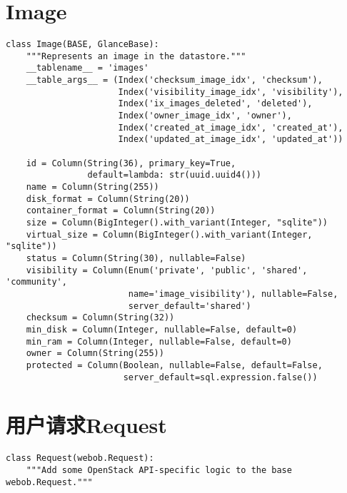 \documentclass[a4paper,left=1.5cm,right=1.5cm,11pt]{article}
\begin{document}
\section{Image}
    \begin{lstlisting}
class Image(BASE, GlanceBase):
    """Represents an image in the datastore."""
    __tablename__ = 'images'
    __table_args__ = (Index('checksum_image_idx', 'checksum'),
                      Index('visibility_image_idx', 'visibility'),
                      Index('ix_images_deleted', 'deleted'),
                      Index('owner_image_idx', 'owner'),
                      Index('created_at_image_idx', 'created_at'),
                      Index('updated_at_image_idx', 'updated_at'))

    id = Column(String(36), primary_key=True,
                default=lambda: str(uuid.uuid4()))
    name = Column(String(255))
    disk_format = Column(String(20))
    container_format = Column(String(20))
    size = Column(BigInteger().with_variant(Integer, "sqlite"))
    virtual_size = Column(BigInteger().with_variant(Integer, "sqlite"))
    status = Column(String(30), nullable=False)
    visibility = Column(Enum('private', 'public', 'shared', 'community',
                        name='image_visibility'), nullable=False,
                        server_default='shared')
    checksum = Column(String(32))
    min_disk = Column(Integer, nullable=False, default=0)
    min_ram = Column(Integer, nullable=False, default=0)
    owner = Column(String(255))
    protected = Column(Boolean, nullable=False, default=False,
                       server_default=sql.expression.false())
    \end{lstlisting}

\section{用户请求Request}
    \begin{lstlisting}
class Request(webob.Request):
    """Add some OpenStack API-specific logic to the base webob.Request."""
    \end{lstlisting}
\end{document}
